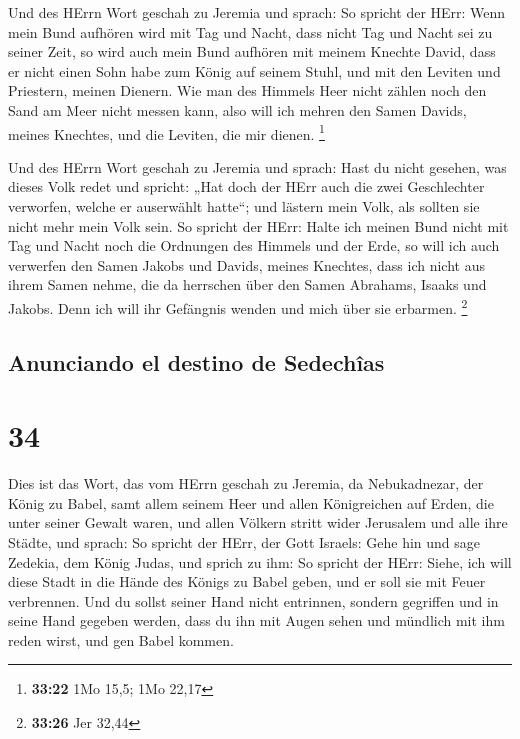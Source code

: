 Und des HErrn Wort geschah zu Jeremia und sprach:
 So spricht der HErr: Wenn mein Bund aufhören wird mit
Tag und Nacht, dass nicht Tag und Nacht sei zu seiner Zeit,
 so wird auch mein Bund aufhören mit meinem Knechte
David, dass er nicht einen Sohn habe zum König auf seinem Stuhl, und mit
den Leviten und Priestern, meinen Dienern.  Wie man des
Himmels Heer nicht zählen noch den Sand am Meer nicht messen kann, also
will ich mehren den Samen Davids, meines Knechtes, und die Leviten, die
mir dienen. \footnote{\textbf{33:22} 1Mo 15,5; 1Mo 22,17}

 Und des HErrn Wort geschah zu Jeremia und sprach:
 Hast du nicht gesehen, was dieses Volk redet und
spricht: „Hat doch der HErr auch die zwei Geschlechter verworfen, welche
er auserwählt hatte``; und lästern mein Volk, als sollten sie nicht mehr
mein Volk sein.  So spricht der HErr: Halte ich meinen
Bund nicht mit Tag und Nacht noch die Ordnungen des Himmels und der
Erde,  so will ich auch verwerfen den Samen Jakobs und
Davids, meines Knechtes, dass ich nicht aus ihrem Samen nehme, die da
herrschen über den Samen Abrahams, Isaaks und Jakobs. Denn ich will ihr
Gefängnis wenden und mich über sie erbarmen. \footnote{\textbf{33:26}
  Jer 32,44}

\hypertarget{anunciando-el-destino-de-sedechuxeeas}{%
\subsection{Anunciando el destino de
Sedechîas}\label{anunciando-el-destino-de-sedechuxeeas}}

\hypertarget{section-33}{%
\section{34}\label{section-33}}

 Dies ist das Wort, das vom HErrn geschah zu Jeremia, da
Nebukadnezar, der König zu Babel, samt allem seinem Heer und allen
Königreichen auf Erden, die unter seiner Gewalt waren, und allen Völkern
stritt wider Jerusalem und alle ihre Städte, und sprach: 
So spricht der HErr, der Gott Israels: Gehe hin und sage Zedekia, dem
König Judas, und sprich zu ihm: So spricht der HErr: Siehe, ich will
diese Stadt in die Hände des Königs zu Babel geben, und er soll sie mit
Feuer verbrennen.  Und du sollst seiner Hand nicht
entrinnen, sondern gegriffen und in seine Hand gegeben werden, dass du
ihn mit Augen sehen und mündlich mit ihm reden wirst, und gen Babel
kommen.


